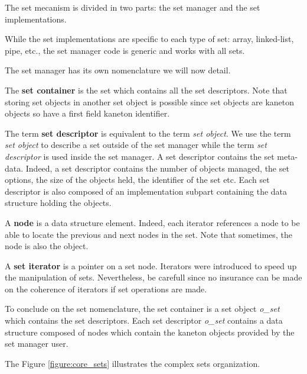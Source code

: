 The set mecanism is divided in two parts: the set manager and the set
implementations.

While the set implementations are specific to each type of set: array,
linked-list, pipe, etc., the set manager code is generic and works with all
sets.

The set manager has its own nomenclature we will now detail.

The \textbf{set container} is the set which contains all the set descriptors.
Note that storing set objects in another set object is possible since
set objects are kaneton objects so have a first field kaneton identifier.

The term \textbf{set descriptor} is equivalent to the term \textit{set object}.
We use the term \textit{set object} to describe a set outside of the set
manager while the term \textit{set descriptor} is used inside the set
manager. A set descriptor contains the set meta-data. Indeed, a set descriptor
contains the number of objects managed, the set options, the size of the
objects held, the identifier of the set etc. Each set descriptor is also
composed of an implementation subpart containing the data structure holding
the objects.

A \textbf{node} is a data structure element. Indeed, each iterator
references a node to be able to locate the previous and next nodes in
the set. Note that sometimes, the node is also the object.

A \textbf{set iterator} is a pointer on a set node. Iterators were
introduced to speed up the manipulation of sets. Nevertheless, be carefull
since no insurance can be made on the coherence of iterators if set
operations are made.

To conclude on the set nomenclature, the set container is a set object
\textit{o\_set} which contains the set descriptors. Each set descriptor
\textit{o\_set} contains a data structure composed of nodes which
contain the kaneton objects provided by the set manager user.

The Figure \ref{figure:core_sets} illustrates the complex sets organization.

